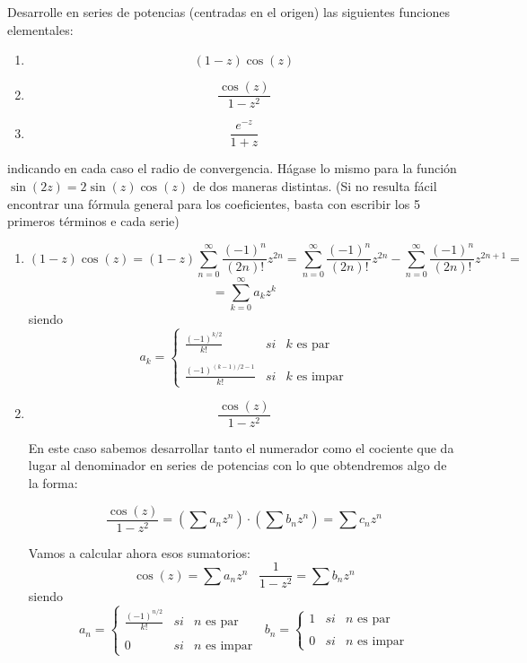 \begin{problem}[5]
Desarrolle en series de potencias (centradas en el origen) las siguientes funciones elementales:
\begin{enumerate}
\item \[(1-z)\cos(z)\]
\item \[\frac{\cos(z)}{1-z^2}\]
\item \[\frac{e^{-z}}{1+z}\]
\end{enumerate}

indicando en cada caso el radio de convergencia. Hágase lo mismo para la función $\sin(2z)=2\sin(z)\cos(z)$ de dos maneras distintas. (Si no resulta fácil encontrar una fórmula general para los coeficientes, basta con escribir los 5 primeros términos e cada serie)
\solution

\begin{enumerate}
\item

\[(1-z)\cos(z) = (1-z)\sum_{n=0}^{\infty}\frac{(-1)^n}{(2n)!}z^{2n}=\sum_{n=0}^{\infty}\frac{(-1)^n}{(2n)!}z^{2n}-\sum_{n=0}^{\infty}\frac{(-1)^n}{(2n)!}z^{2n+1} =\]
\[= \sum_{k=0}^{\infty}a_kz^k\]
siendo
\[a_k= \left\{ \begin{array}{lcc}
             \frac{(-1)^{k/2}}{k!} &   si  & k \text{ es par} \\
             \\ \frac{(-1)^{(k-1)/2-1}}{k!} &  si  & k \text{ es impar}
             \end{array}
   \right.\]


\item
\[\frac{\cos(z)}{1-z^2}\]

En este caso sabemos desarrollar tanto el numerador como el cociente que da lugar al denominador en series de potencias con lo que obtendremos algo de la forma:

\[\frac{\cos(z)}{1-z^2} = \left(\sum a_n z^n \right)\cdot \left( \sum b_nz^n\right)=\sum c_n z^n\]

Vamos a calcular ahora esos sumatorios:
\[\cos(z)=\sum a_n z^n \; \; \; \frac{1}{1-z^2} = \sum b_n z^n\]
siendo
\[a_n= \left\{ \begin{array}{lcc}
             \frac{(-1)^{n/2}}{k!} &   si  & n \text{ es par} \\
             \\0  &  si  & n \text{ es impar}
             \end{array}
   \right.  \; \; b_n= \left\{ \begin{array}{lcc}
             1 &   si  & n \text{ es par} \\
             \\0  &  si  & n \text{ es impar}
             \end{array}
   \right.\]


\end{enumerate}
\end{problem}
